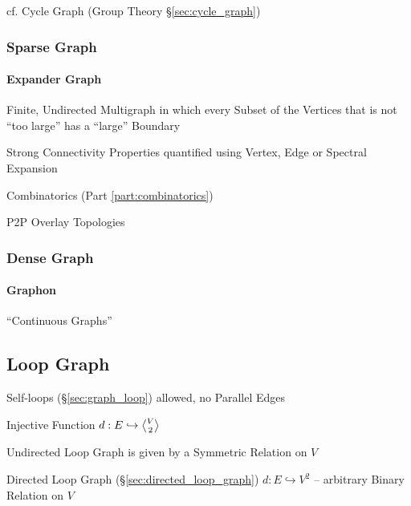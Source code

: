 cf. Cycle Graph (Group Theory \S\ref{sec:cycle_graph})



\subsubsection{Sparse Graph}\label{sec:sparse_graph}

\paragraph{Expander Graph}\label{sec:expander_graph}\hfill


Finite, Undirected Multigraph in which every Subset of the Vertices that is not
``too large'' has a ``large'' Boundary

Strong Connectivity Properties quantified using Vertex, Edge or Spectral
Expansion

Combinatorics (Part \ref{part:combinatorics})

P2P Overlay Topologies



\subsubsection{Dense Graph}\label{sec:dense_graph}

\paragraph{Graphon}\label{sec:graphon}

``Continuous Graphs''



\subsection{Loop Graph}\label{sec:loop_graph}

Self-loops (\S\ref{sec:graph_loop}) allowed, no Parallel Edges

Injective Function $d : E \hookrightarrow \angleover{V}{2}$

Undirected Loop Graph is given by a Symmetric Relation on $V$

Directed Loop Graph (\S\ref{sec:directed_loop_graph}) $d : E
\hookrightarrow V^2$ -- arbitrary Binary Relation on $V$



